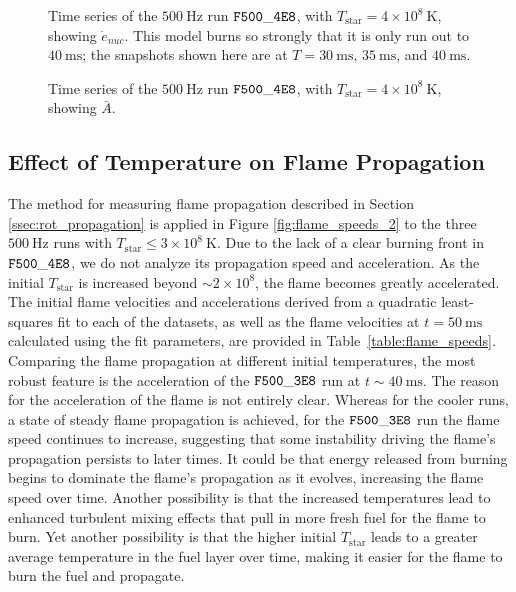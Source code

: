 \documentclass[preprint,times,tighten]{aastex63}
\begin{document}
\begin{figure}[t]
	\centering
	\caption{\label{fig:4e8_stacked_enuc} Time series of the $500~\mathrm{Hz}$ run $\tt{F500\_4E8}$, with $T_{\mathrm{star}} = 4 \times 10^8~\mathrm{K}$, showing $\dot{e}_{nuc}$. This model burns so strongly that it is only run out to $40~\mathrm{ms}$; the snapshots shown here are at $T = 30~\mathrm{ms}$, $35~\mathrm{ms}$, and $40~\mathrm{ms}$.}
\end{figure}

\begin{figure}[t]
	\centering
	\caption{\label{fig:4e8_stacked_abar} Time series of the $500~\mathrm{Hz}$ run $\tt{F500\_4E8}$, with $T_{\mathrm{star}} = 4 \times 10^8~\mathrm{K}$, showing $\bar{A}$.}
\end{figure}


\subsection{Effect of Temperature on Flame Propagation}\label{ssec:temp_prop}

The method for measuring flame propagation described in Section \ref{ssec:rot_propagation} is 
applied in Figure \ref{fig:flame_speeds_2} to the three $500~\mathrm{Hz}$ runs with 
$T_{\mathrm{star}} \leq 3 \times 10^8~\mathrm{K}$. Due to the lack of a clear burning front in 
$\tt{F500\_4E8}$, we do not analyze its propagation speed and acceleration. As the initial 
$T_{\mathrm{star}}$ is increased beyond $\sim 2\times 10^8$, the flame becomes greatly accelerated. The initial flame 
velocities and accelerations derived from a quadratic least-squares fit to each of the datasets, as 
well as the flame velocities at $t = 50~\mathrm{ms}$ calculated using the fit parameters, are 
provided in Table~\ref{table:flame_speeds}. Comparing the flame propagation at different initial 
temperatures, the most robust feature is the acceleration of the $\tt{F500\_3E8}$ run at $t \sim 
40~\mathrm{ms}$. The reason for the acceleration of the flame is not entirely clear. 
Whereas for the cooler runs, a state of steady flame propagation is achieved, for the $\tt{F500\_3E8}$ run
the flame speed continues to increase, suggesting that some instability driving the 
flame's propagation persists to later times. It could be 
that energy released from burning begins to dominate the flame's propagation as it evolves, 
increasing the flame speed over time. Another possibility is that the increased temperatures lead 
to enhanced turbulent mixing effects that pull in more fresh fuel for the flame to burn. Yet 
another possibility is that the higher initial $T_{\mathrm{star}}$ leads to a greater average 
temperature in the fuel layer over time, making it easier for the flame to burn the fuel and 
propagate. 
\end{document}
